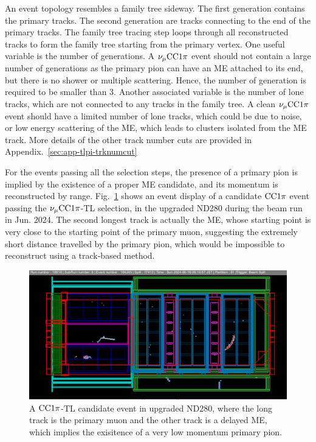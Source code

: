             An event topology resembles a family tree sideway. 
            The first generation contains the primary tracks.
            The second generation are tracks connecting to the end of the primary tracks.
            The family tree tracing step loops through all reconstructed tracks to form the family tree starting from the primary vertex.
            One useful variable is the number of generations.
            A $\nu_{\mu}\textrm{CC}1\pi$ event should not contain a large number of generations as the primary pion can have an ME attached to its end, but there is no shower or multiple scattering.
            Hence, the number of generation is required to be smaller than $3$.
            Another associated variable is the number of lone tracks, which are not connected to any tracks in the family tree. 
            A clean $\nu_{\mu}\textrm{CC}1\pi$ event should have a limited number of lone tracks, which could be due to noise, or low energy scattering of the ME, which leads to clusters isolated from the ME track. 
            More details of the other track number cuts are provided in Appendix.~\ref{sec:app-tlpi-trknumcut}
        
            For the events passing all the selection steps, the presence of a primary pion is implied by the existence of a proper ME candidate, and its momentum is reconstructed by range. 
          Fig.~\ref{fig:cc1pi-tl} shows an event display of a candidate $\textrm{CC}1\pi$ event passing the $\nu_{\mu}\textrm{CC}1\pi$-TL selection, in the upgraded ND280 during the beam run in Jun. 2024.
          The second longest track is actually the ME, whose starting point is very close to the starting point of the primary muon, suggesting the extremely short distance travelled by the primary pion, which would be impossible to reconstruct using a track-based method.
          \begin{figure}[!htb] 	
               \centering 		
               \includegraphics[width=\sgfigwid\textwidth]{figures/shortPion.png}
               \caption{\label{fig:cc1pi-tl} A $\textrm{CC}1\pi$-TL candidate event in upgraded ND280, where the long track is the primary muon and the other track is a delayed ME, which implies the exisitence of a very low momentum primary pion.} 
          \end{figure}



